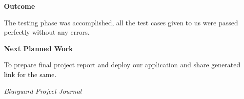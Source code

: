 \documentclass[12pt,a4paper]{article}
\begin{document}

\textbf{\large Outcome}

\vspace{4pt}

The testing phase was accomplished, all the test cases given to us were passed perfectly without any errors.

\vspace{8pt}


\textbf{\large Next Planned Work}

\vspace{4pt}

To prepare final project report and deploy our application and share generated link for the same.

\vfill


\begin{flushright}
    \textit{Blurguard Project Journal}
\end{flushright}
\end{document}
